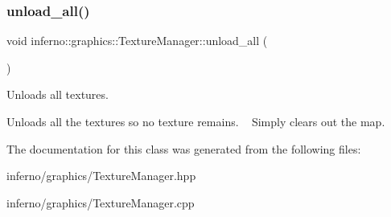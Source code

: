 \subsubsection{\texorpdfstring{unload\+\_\+all()}{unload\_all()}}
{\footnotesize\ttfamily void inferno\+::graphics\+::\+Texture\+Manager\+::unload\+\_\+all (\begin{DoxyParamCaption}{ }\end{DoxyParamCaption})}



Unloads all textures. 

Unloads all the textures so no texture remains. ~\newline
Simply clears out the map. 

The documentation for this class was generated from the following files\+:\begin{DoxyCompactItemize}
\item 
inferno/graphics/Texture\+Manager.\+hpp\item 
inferno/graphics/Texture\+Manager.\+cpp\end{DoxyCompactItemize}
